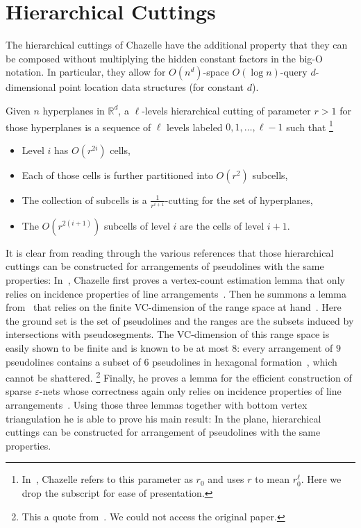 \section{Hierarchical Cuttings}%
\label{sec:divide-and-conquer:hierarchical-cuttings}

The hierarchical cuttings of Chazelle
have the additional property that they can be composed without multiplying the
hidden constant factors in the big-O notation. In particular, they allow
for \(O(n^d)\)-space \(O(\log n)\)-query \(d\)-dimensional point location data
structures (for constant \(d\)).
\ifjournal
  \begin{definition}
    Given \(n\) hyperplanes in \(\mathbb{R}^d\),
    a \(\ell\)-levels hierarchical cutting of parameter \(r > 1\)
    for those hyperplanes
    is a sequence of \(\ell\) levels labeled \(0,1, \ldots, \ell - 1\)
    such that%
    \footnote{In~\cite{C93}, Chazelle refers to this parameter as
    \(r_0\) and uses \(r\) to mean \(r_0^\ell\). Here we drop the subscript for
    ease of presentation.}
    \begin{itemize}
      \item Level \(i\) has \(O(r^{2i})\) cells,
      \item Each of those cells is further partitioned into \(O(r^2)\)
        subcells,
      \item The collection of subcells is a \(\frac{1}{r^{i+1}}\)-cutting for
        the set of hyperplanes,
      \item The \(O(r^{2(i+1)})\) subcells of level \(i\) are the cells of level \(i+1\).
    \end{itemize}
  \end{definition}
  It is clear from reading through the various references that those
  hierarchical cuttings can be constructed for arrangements of pseudolines with
  the same properties:
  In~\cite{C93},
  Chazelle first proves a vertex-count estimation lemma
  that only relies on incidence properties of line
  arrangements~\cite[Lemma~2.1]{C93}. Then he summons a lemma from~\cite{Ma93}
  that relies on the finite VC-dimension of the range space at
  hand~\cite[Lemma~3.1]{C93}.
  Here the ground set is the set of pseudolines and the ranges are the
  subsets induced by intersections with pseudosegments.
  The VC-dimension of this range space
  is easily shown to be finite and is known to be at most
  \(8\): every arrangement of \(9\) pseudolines contains a subset of
  \(6\) pseudolines in hexagonal formation~\cite{HM94}, which cannot be
  shattered.%
  \footnote{This a quote from~\cite{BMP05}. We could not access
  the original paper.}
  Finally, he proves a lemma for the efficient construction of
  sparse \(\varepsilon\)-nets whose correctness again only relies on incidence
  properties of line arrangements~\cite[Lemma 3.2]{C93}.
  Using those three lemmas together with bottom vertex triangulation he is
  able to prove his main result:
\else%
In the plane, hierarchical cuttings can be
constructed for arrangement of pseudolines with the same properties.
\fi


